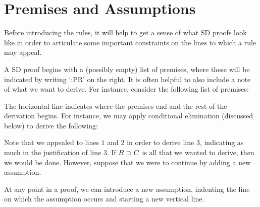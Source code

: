 \section{Premises and Assumptions}
\label{sec:PremiseAssumption}

Before introducing the rules, it will help to get a sense of what SD proofs look like in order to articulate some important constraints on the lines to which a rule may appeal.

A SD proof begins with a (possibly empty) list of premises, where these will be indicated by writing `:PR' on the right.
It is often helpful to also include a note of what we want to derive.
For instance, consider the following list of premises:
\begin{fitchproof}
   \pr{}
   \pr{}
\end{fitchproof}
The horizontal line indicates where the premises end and the rest of the derivation begins.
For instance, we may apply conditional elimination (discussed below) to derive the following:
\begin{fitchproof}
   \pr{}
   \pr{}
   
\end{fitchproof}
Note that we appealed to lines $1$ and $2$ in order to derive line $3$, indicating as much in the justification of line $3$. 
If $B \supset C$ is all that we wanted to derive, then we would be done. 
However, suppose that we were to continue by adding a new assumption.
\begin{fitchproof}
   \pr{}
   \pr{}
   
  \open
     \as{}
  \close
\end{fitchproof}
At any point in a proof, we can introduce a new assumption, indenting the line on which the assumption occurs and starting a new vertical line.
